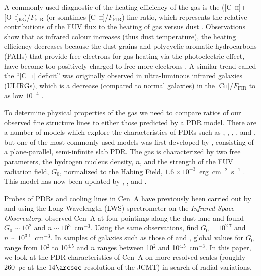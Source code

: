 \documentclass[preprint2]{aastex}
\begin{document}
A commonly used diagnostic of the heating efficiency of the gas is the
([C~\textsc{ii}]+[O~\textsc{i}]$_{63}$)/$F_{\mathrm{FIR}}$ (or somtimes [C~\textsc{ii}]/$F_{\mathrm{FIR}}$) line ratio, which represents the relative contributions of the FUV flux to the heating of gas versus dust \citep{1985ApJ...291..722T}.  Observations show that as infrared colour increases (thus dust temperature), the heating efficiency decreases because the dust grains and polycyclic aromatic hydrocarbons (PAHs) that provide free electrons for gas heating via the photoelectric effect, have become too positively charged to free more electrons \citep{2001ApJ...561..766M, 2008ApJS..178..280B, 2011ApJ...728L...7G, 2012ApJ...747...81C, 2012A&A...544A..55B, 2012A&A...548A..91L, 2013A&A...549A.118C, parkin_2013}.  A similar trend called the ``[C~\textsc{ii}] deficit'' was originally observed in ultra-luminous infrared galaxies (ULIRGs), which is a decrease (compared to normal galaxies) in the [C\textsc{ii}]/$F_{\mathrm{FIR}}$ to as low $10^{-4}$ \citep[e.g.][]{1998ApJ...504L..11L,2003ApJ...594..758L}.

To determine physical properties of the gas we need to compare ratios of our observed fine structure lines to either those predicted by a PDR model.  There are a number of models which explore the characteristics of PDRs such as \citet{1986ApJS...62..109V,1988ApJ...334..771V}, \citet{1989ApJ...338..197S, 1995ApJS...99..565S}, \citet{1997ApJ...482..298L}, \citet{2000A&A...358..682S}, \citet{2006ApJS..164..506L} and \citet{2006A&A...451..917R}, but one of the most commonly used models was first developed by \citet{1985ApJ...291..722T}, consisting of a plane-parallel, semi-infinite slab PDR.  The gas is characterized by two free parameters, the hydrogen nucleus density, $n$, and the strength of the FUV radiation field, $G_0$, normalized to the Habing Field, $1.6 \times 10^{-3}$~erg~cm$^{-2}$~s$^{-1}$ \citep{1968BAN....19..421H}.  This model has now been updated by \citet{1990ApJ...358..116W}, \cite{1991ApJ...377..192H}, and \citet{1999ApJ...527..795K,2006ApJ...644..283K}.

Probes of PDRs and cooling lines in Cen~A have previously been carried out by \citet{2000A&A...355..885U} and \citet{2001A&A...375..566N} using the Long Wavelength (LWS) spectrometer on the \emph{Infrared Space Observatory}.  \citet{2000A&A...355..885U} observed Cen~A at four pointings along the dust lane and found $G_{0} \sim 10^{2}$ and $n \sim 10^{3}$~cm$^{-3}$.  Using the same observations, \citet{2001A&A...375..566N} find $G_{0} = 10^{2.7}$ and $n \sim 10^{3.1}$~cm$^{-3}$.  In samples of galaxies such as those of \citet{2001ApJ...561..766M} and \citet{2001A&A...375..566N}, global values for $G_{0}$ range from 10$^{2}$ to 10$^{4.5}$ and $n$ ranges between 10$^{2}$ and 10$^{4.5}$~cm$^{-3}$.  In this paper, we look at the PDR characteristics of Cen~A on more resolved scales (roughly 260~pc at the 14$\arcsec$ resolution of the JCMT) in search of radial variations.
\end{document}
